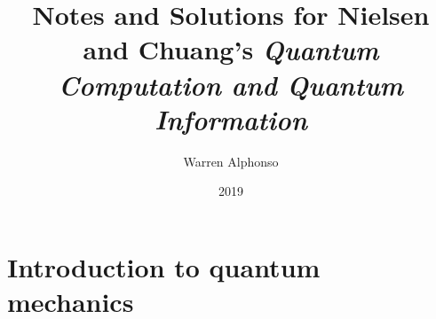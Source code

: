 \documentclass[9pt]{extbook}
\title{Notes and Solutions for Nielsen and Chuang's \textit{Quantum Computation and Quantum Information}}
\date{2019}
\author{Warren Alphonso}
\begin{document}
\frontmatter 
\let\cleardoublepage\clearpage 
\maketitle
\tableofcontents

\mainmatter



\chapter{Introduction to quantum mechanics}
\end{document}
